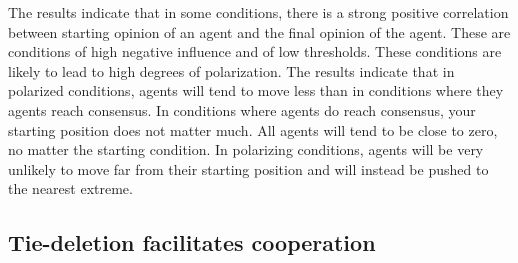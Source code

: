\documentclass{article}
\begin{document}
The results indicate that in some conditions, there is a strong positive correlation between starting opinion of an agent and the final opinion of the agent. 
These are conditions of high negative influence and of low thresholds. These conditions are likely to lead to high degrees of polarization. The results indicate that in polarized conditions, agents will tend to move less than in conditions where they agents reach consensus. In conditions where agents do reach consensus, your starting position does not matter much. All agents will tend to be close to zero, no matter the starting condition. In polarizing conditions, agents will be very unlikely to move far from their starting position and will instead be pushed to the nearest extreme. 

\subsection{Tie-deletion facilitates cooperation}
\end{document}
